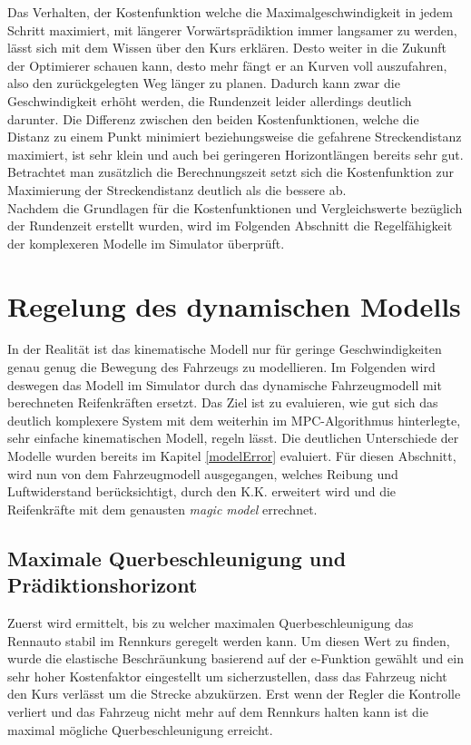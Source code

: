 \documentclass{like}
\begin{document}
\begin{figure}
	\centering
	 
	\caption{}
	\label{fig:lapTimeKin}
\end{figure}

Das Verhalten, der Kostenfunktion welche die Maximalgeschwindigkeit in jedem Schritt maximiert, mit längerer Vorwärtsprädiktion immer langsamer zu werden, lässt sich mit dem Wissen über den Kurs erklären. Desto weiter in die Zukunft der Optimierer schauen kann, desto mehr fängt er an Kurven voll auszufahren, also den zurückgelegten Weg länger zu planen. Dadurch kann zwar die Geschwindigkeit erhöht werden, die Rundenzeit leider allerdings deutlich darunter. 
Die Differenz zwischen den beiden Kostenfunktionen, welche die Distanz zu einem Punkt minimiert beziehungsweise die gefahrene Streckendistanz maximiert, ist sehr klein und auch bei geringeren Horizontlängen bereits sehr gut. Betrachtet man zusätzlich die Berechnungszeit setzt sich die Kostenfunktion zur Maximierung der Streckendistanz deutlich als die bessere ab. \\
Nachdem die Grundlagen für die Kostenfunktionen und Vergleichswerte bezüglich der Rundenzeit erstellt wurden, wird im Folgenden Abschnitt die Regelfähigkeit der komplexeren Modelle im Simulator überprüft.


\newpage
\chapter{Regelung des dynamischen Modells}
\label{dynModelcontrol}
In der Realität ist das kinematische Modell nur für geringe Geschwindigkeiten genau genug die Bewegung des Fahrzeugs zu modellieren. Im Folgenden wird deswegen das Modell im Simulator durch das dynamische Fahrzeugmodell mit berechneten Reifenkräften ersetzt. Das Ziel ist zu evaluieren, wie gut sich das deutlich komplexere System mit dem weiterhin im \ac{MPC}-Algorithmus hinterlegte, sehr einfache kinematischen Modell, regeln lässt.
Die deutlichen Unterschiede der Modelle wurden bereits im Kapitel \ref{modelError} evaluiert. Für diesen Abschnitt, wird nun von dem Fahrzeugmodell ausgegangen, welches Reibung und Luftwiderstand berücksichtigt, durch den \ac{K.K.} erweitert wird und die Reifenkräfte mit dem genausten \emph{magic model} errechnet.

\section{Maximale Querbeschleunigung und Prädiktionshorizont}
Zuerst wird ermittelt, bis zu welcher maximalen Querbeschleunigung das Rennauto stabil im Rennkurs geregelt werden kann. Um diesen Wert zu finden, wurde die elastische Beschräunkung basierend auf der e-Funktion gewählt und ein sehr hoher Kostenfaktor eingestellt um sicherzustellen, dass das Fahrzeug nicht den Kurs verlässt um die Strecke abzukürzen. Erst wenn der Regler die Kontrolle verliert und das Fahrzeug nicht mehr auf dem Rennkurs halten kann ist die maximal mögliche Querbeschleunigung erreicht.
\end{document}
